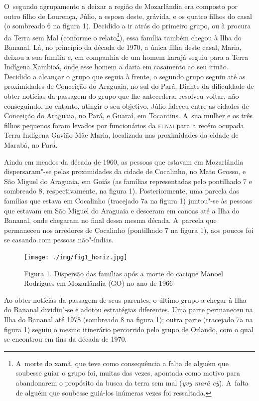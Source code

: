 O~segundo agrupamento a deixar a região de Mozarlândia era composto por
outro filho de Lourença, Júlio, a esposa deste, grávida, e os quatro
filhos do casal (o sombreado 6 na figura 1). Decidido a ir atrás do
primeiro grupo, ou à procura da Terra sem Mal (conforme o
relato\footnote{A~morte do xamã, que teve como consequência a falta de
alguém que soubesse guiar o grupo foi, muitas das vezes, apontada como
motivo para abandonarem o propósito da busca da terra sem mal (\emph{yvy marã
eÿ}). A~falta de alguém que soubesse guiá-los inúmeras vezes foi
ressaltada.}), essa família também chegou à Ilha do Bananal. Lá, no
princípio da década de 1970, a única filha deste casal, Maria, deixou a
sua família e, em companhia de um homem karajá seguiu para a Terra
Indígena Xambioá, onde esse homem a daria em casamento ao seu irmão.
Decidido a alcançar o grupo que seguia à frente, o segundo grupo seguiu
até as proximidades de Conceição do Araguaia, no sul do Pará. Diante da
dificuldade de obter notícias da passagem do grupo que lhe antecedera,
resolveu voltar, não conseguindo, no entanto, atingir o seu objetivo.
Júlio faleceu entre as cidades de Conceição do Araguaia, no Pará, e
Guaraí, em Tocantins. A~sua mulher e os três filhos pequenos foram
levados por funcionários da \textsc{funai} para a recém ocupada Terra Indígena
Gavião Mãe Maria, localizada nas proximidades da cidade de Marabá, no
Pará. 

Ainda em meados da década de 1960, as pessoas que estavam em Mozarlândia
dispersaram"-se pelas proximidades da cidade de Cocalinho, no Mato
Grosso, e São Miguel do Araguaia, em Goiás (as famílias representadas
pelo pontilhado 7 e sombreado 8, respectivamente, na figura 1).
Posteriormente, uma parcela das famílias que estava em Cocalinho
(tracejado 7a na figura 1) juntou"-se às pessoas que estavam em São
Miguel do Araguaia e desceram em canoas até a Ilha do Bananal, onde
chegaram no final dessa mesma década. A~parcela que permaneceu nos
arredores de Cocalinho (pontilhado 7 na figura 1), aos poucos foi se
casando com pessoas não"-índias. 


\begin{figure}
 \centering
\texttt{[image: ./img/fig1\_horiz.jpg]}	
 \hfill
 \caption{Figura 1. Dispersão das famílias após a morte do cacique Manoel Rodrigues em Mozarlândia (GO) no ano de 1966}
\end{figure} 



Ao obter notícias da passagem de seus parentes, o último grupo a chegar
à Ilha do Bananal dividiu"-se e adotou estratégias diferentes. Uma parte
permaneceu na Ilha do Bananal até 1978 (sombreado 8 na figura 1); outra
parte (tracejado 7a na figura 1) seguiu o mesmo itinerário percorrido
pelo grupo de Orlando, com o qual se encontrou em fins da década de
1970.

